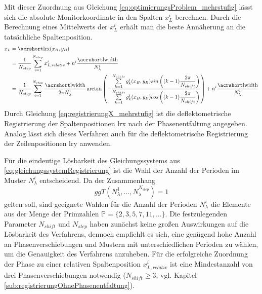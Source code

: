\p
Mit dieser Zuordnung aus Gleichung \ref{eq:optimierungsProblem_mehrstufig} lässt sich die absolute Monitorkoordinate in den Spalten $x_L^i$ berechnen.
Durch die Berechnung eines Mittelwerts der $x_L^i$ erhält man die beste Annäherung an die tatsächliche Spaltenposition.
%
\begin{equation}\label{eq:registrierungX_mehrstufig}
	\begin{split}
		x_L
		& =
			\acrshortmath{lrx}(x_B, y_B)\\
		& =
			\dfrac{1}{N_{step}}
			\sum\limits_{i = 1}^{N_{step}}
			x_{L,relativ}^i + n^i \dfrac{\acrshortmath{lwidth}}{N_\lambda^i}\\
		& =
			\dfrac{1}{N_{step}}
			\sum\limits_{i = 1}^{N_{step}}
			\dfrac{\acrshortmath{lwidth}}{2\pi N_\lambda^i}
			\arctan
			\left(
				-\dfrac
				{\sum\limits_{k=1}^{N_{shift}} g_k^i(x_B, y_B) sin\left((k - 1)\dfrac{2\pi}{N_{shift}}\right)}
				{\sum\limits_{k=1}^{N_{shift}} g_k^i(x_B, y_B) cos\left((k - 1)\dfrac{2\pi}{N_{shift}}\right)}
			\right)
			+ n^i \dfrac{\acrshortmath{lwidth}}{N_\lambda^i}
	\end{split}
\end{equation}
%
Durch Gleichung \ref{eq:registrierungX_mehrstufig} ist die deflektometrische Registrierung der Spaltenpositionen \acrshort{lrx} nach der Phasenentfaltung angegeben.
Analog lässt sich dieses Verfahren auch für die deflektometrische Registrierung der Zeilenpositionen \acrshort{lry} anwenden.

\p
Für die eindeutige Lösbarkeit des Gleichungssystems aus \ref{eq:gleichungssystemRegistrierung} ist die Wahl der Anzahl der Perioden im Muster $N_\lambda^i$ entscheidend.
Da der Zusammenhang
%
\begin{equation*}
	ggT(N_\lambda^1, \ldots, N_\lambda^{N_{step}}) = 1
\end{equation*}
%
gelten soll, sind geeignete Wahlen für die Anzahl der Perioden $N_\lambda^i$ die Elemente aus der Menge der Primzahlen $\mathbb{P} = \lbrace 2, 3, 5, 7, 11,\ldots\rbrace$.
Die festzulegenden Parameter $N_{shift}$ und $N_{step}$ haben zunächst keine großen Auswirkungen auf die Lösbarkeit des Verfahrens, dennoch empfiehlt es sich, eine genügend hohe Anzahl an Phasenverschiebungen und Mustern mit unterschiedlichen Perioden zu wählen, um die Genauigkeit des Verfahrens anzuheben.
Für die erfolgreiche Zuordnung der Phase zu einer relativen Spaltenposition $x_{L,relativ}^i$ ist eine Mindestanzahl von drei Phasenverschiebungen notwendig ($N_{shift} \geq 3$, vgl. Kapitel \ref{sub:registrierungOhnePhasenentfaltung}). 


